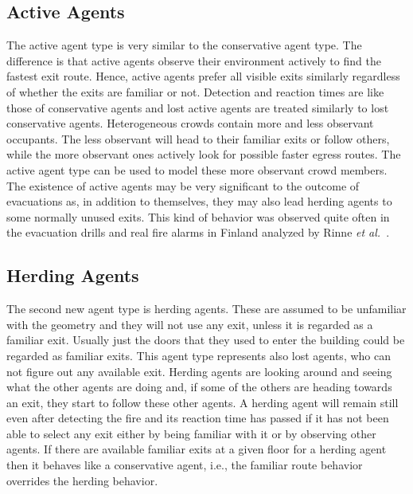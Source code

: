 \documentclass[12pt,a4paper,final,twoside]{stylevk}
\begin{document}
\subsection{Active Agents}\label{Sec_ActiveAgents}

\noindent The active agent type is very similar to the conservative
agent type.  The difference is that active agents observe their
environment actively to find the fastest exit route.  Hence, active
agents prefer all visible exits similarly regardless of whether the exits are
familiar or not.  Detection and reaction times are like those of
conservative agents and lost active agents are treated similarly to
lost conservative agents.  Heterogeneous crowds contain more and less
observant occupants.  The less observant will head to their familiar
exits or follow others, while the more observant ones actively look
for possible faster egress routes.  The active agent type can be used
to model these more observant crowd members.  The existence of active
agents may be very significant to the outcome of evacuations as, in
addition to themselves, they may also lead herding agents to some
normally unused exits.  This kind of behavior was observed quite often
in the evacuation drills and real fire alarms in Finland analyzed by
Rinne \emph{et al.}~\cite{Rinne10}.


\subsection{Herding Agents}\label{Sec_HerdingAgents}

\noindent The second new agent type is herding agents.  These are
assumed to be unfamiliar with the geometry and they will not use any
exit, unless it is regarded as a familiar exit.  Usually just the
doors that they used to enter the building could be regarded as
familiar exits.  This agent type represents also lost agents, who can
not figure out any available exit.  Herding agents are looking around
and seeing what the other agents are doing and, if some of the others
are heading towards an exit, they start to follow these other agents.
A herding agent will remain still even after detecting the fire and
its reaction time has passed if it has not been able to select any
exit either by being familiar with it or by observing other agents.
If there
are available familiar exits at a given floor for a herding agent then
it behaves like a conservative agent, i.e., the familiar route
behavior overrides the herding behavior.
\end{document}
